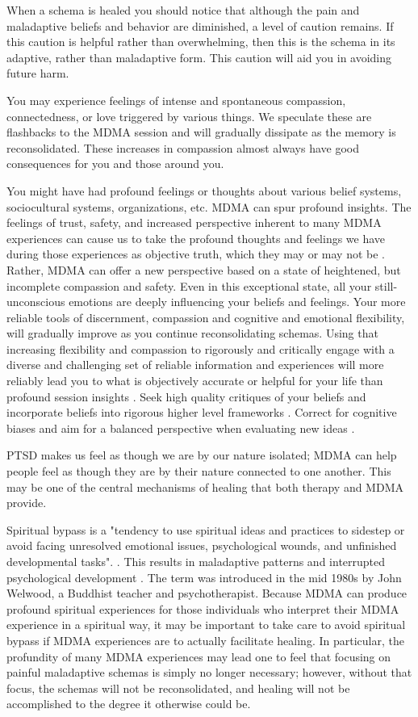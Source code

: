 \documentclass[12pt,letterpaper]{article}
\begin{document}
When a schema is healed you should notice that although the pain and maladaptive beliefs and behavior are diminished, a level of caution remains. If this caution is helpful rather than overwhelming, then this is the schema in its adaptive, rather than maladaptive form. This caution will aid you in avoiding future harm.

You may experience feelings of intense and spontaneous compassion, connectedness, or love triggered by various things. We speculate these are flashbacks to the MDMA session and will gradually dissipate as the memory is reconsolidated. These increases in compassion almost always have good consequences for you and those around you.

You might have had profound feelings or thoughts about various belief systems, sociocultural systems, organizations, etc. MDMA can spur profound insights. The feelings of trust, safety, and increased perspective inherent to many MDMA experiences can cause us to take the profound thoughts and feelings we have during those experiences as objective truth, which they may or may not be \cite{hartogsohn2018meaning}. Rather, MDMA can offer a new perspective based on a state of heightened, but incomplete compassion and safety. Even in this exceptional state, all your still-unconscious emotions are deeply influencing your beliefs and feelings. Your more reliable tools of discernment, compassion and cognitive and emotional flexibility, will gradually improve as you continue reconsolidating schemas. Using that increasing flexibility and compassion to rigorously and critically engage with a diverse and challenging set of reliable information and experiences will more reliably lead you to what is objectively accurate or helpful for your life than profound session insights \cite{bentzMindfulInquiry}. Seek high quality critiques of your beliefs and incorporate beliefs into rigorous higher level frameworks \cite{saganDemon}. Correct for cognitive biases and aim for a balanced perspective when evaluating new ideas \cite{galefScoutMindset}.

PTSD makes us feel as though we are by our nature isolated; MDMA can help people feel as though they are by their nature connected to one another. This may be one of the central mechanisms of healing that both therapy and MDMA provide.

Spiritual bypass is a "tendency to use spiritual ideas and practices to sidestep or avoid facing unresolved emotional issues, psychological wounds, and unfinished developmental tasks". . This results in maladaptive patterns and interrupted psychological development . The term was introduced in the mid 1980s by John Welwood, a Buddhist teacher and psychotherapist. Because MDMA can produce profound spiritual experiences for those individuals who interpret their MDMA experience in a spiritual way, it may be important to take care to avoid spiritual bypass if MDMA experiences are to actually facilitate healing. In particular, the profundity of many MDMA experiences may lead one to feel that focusing on painful maladaptive schemas is simply no longer necessary; however, without that focus, the schemas will not be reconsolidated, and healing will not be accomplished to the degree it otherwise could be.
\end{document}
